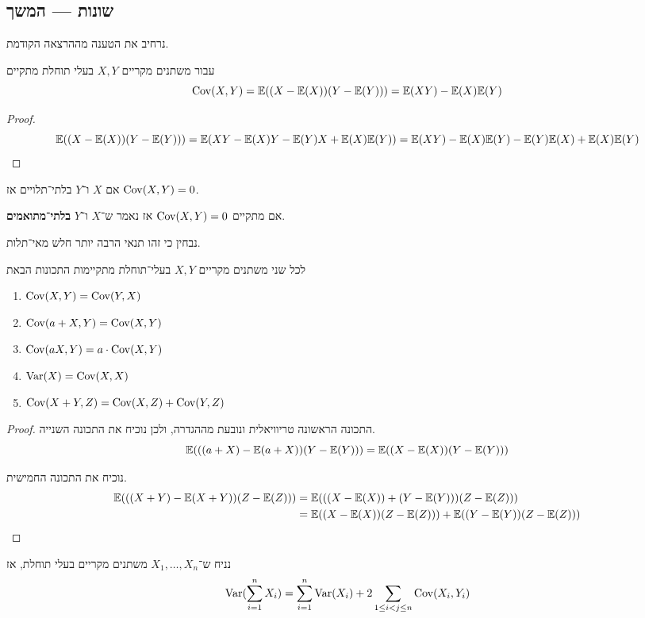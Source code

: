 \subsection{שונות --- המשך}
נרחיב את הטענה מההרצאה הקודמת.
\begin{proposition}
	עבור משתנים מקריים $X, Y$ בעלי תוחלת מתקיים
	\[
		\operatorname{Cov}(X, Y)
		= \mathbb{E}((X - \mathbb{E}(X))(Y - \mathbb{E}(Y)))
		= \mathbb{E}(XY) - \mathbb{E}(X) \mathbb{E}(Y)
	\]
\end{proposition}
\begin{proof}
	\[
		\mathbb{E}((X - \mathbb{E}(X))(Y - \mathbb{E}(Y)))
		= \mathbb{E}(XY - \mathbb{E}(X) Y - \mathbb{E}(Y) X + \mathbb{E}(X) \mathbb{E}(Y))
		= \mathbb{E}(XY) - \mathbb{E}(X) \mathbb{E}(Y) - \mathbb{E}(Y) \mathbb{E}(X) + \mathbb{E}(X) \mathbb{E}(Y)
	\]
\end{proof}
\begin{remark}
	אם $X$ ו־$Y$ בלתי־תלויים אז $\operatorname{Cov}(X, Y) = 0$.
\end{remark}
\begin{definition}
	אם מתקיים $\operatorname{Cov}(X, Y) = 0$ אז נאמר ש־$X$ ו־$Y$ \textbf{בלתי־מתואמים}.
\end{definition}
נבחין כי זהו תנאי הרבה יותר חלש מאי־תלות.
\begin{proposition}
	לכל שני משתנים מקריים $X, Y$ בעלי־תוחלת מתקיימות התכונות הבאת
	\begin{enumerate}
		\item $\operatorname{Cov}(X, Y) = \operatorname{Cov}(Y, X)$
		\item $\operatorname{Cov}(a + X, Y) = \operatorname{Cov}(X, Y)$ 
		\item $\operatorname{Cov}(aX, Y) = a \cdot \operatorname{Cov}(X, Y)$
		\item $\operatorname{Var}(X) = \operatorname{Cov}(X, X)$
		\item $\operatorname{Cov}(X + Y, Z) = \operatorname{Cov}(X, Z) + \operatorname{Cov}(Y, Z)$
	\end{enumerate}
\end{proposition}
\begin{proof}
	התכונה הראשונה טריוויאלית ונובעת מההגדרה, ולכן נוכיח את התכונה השנייה.
	\[
		\mathbb{E}(((a + X) - \mathbb{E}(a + X))(Y - \mathbb{E}(Y)))
		= \mathbb{E}((X - \mathbb{E}(X))(Y - \mathbb{E}(Y)))
	\]

	נוכיח את התכונה החמישית.
	\begin{align*}
		\mathbb{E}(((X + Y) - \mathbb{E}(X + Y))(Z - \mathbb{E}(Z)))
		& = \mathbb{E}(((X - \mathbb{E}(X)) + (Y - \mathbb{E}(Y)))(Z - \mathbb{E}(Z))) \\
		& = \mathbb{E}((X - \mathbb{E}(X))(Z - \mathbb{E}(Z))) + \mathbb{E}((Y - \mathbb{E}(Y))(Z - \mathbb{E}(Z)))
	\end{align*}
\end{proof}
\begin{proposition}
	נניח ש־$X_1, \dots, X_n$ משתנים מקריים בעלי תוחלת, אז
	\[
		\operatorname{Var}(\sum_{i = 1}^{n} X_i)
		= \sum_{i = 1}^{n} \operatorname{Var}(X_i) + 2 \sum_{1 \le i < j \le n} \operatorname{Cov}(X_i, Y_i)
	\]
\end{proposition}
